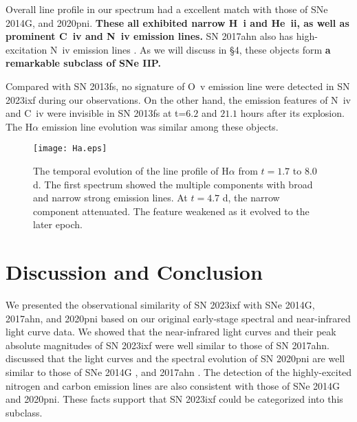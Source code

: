 \documentclass{pasj01}
\begin{document}
 Overall line profile in our spectrum had a excellent 
match with those of SNe 2014G, and 2020pni.
{\bf These all exhibited narrow H~{\sc i} and He~{\sc ii}, as well as 
prominent C~{\sc iv} and N~{\sc iv} emission lines.}
SN 2017ahn also has 
high-excitation N~{\sc iv} emission lines \citep{Tartagrlia2021}. 
As we will discuss in \S 4, these
objects form {\bf a remarkable subclass of SNe IIP.}
 
 Compared with SN 2013fs, no signature of O~{\sc v} 
emission line were detected in SN 2023ixf during 
our observations. On the
other hand, the emission features of N~{\sc iv} and 
C~{\sc iv} were invisible in SN 2013fs at t=$6.2$ and $21.1$ 
hours after its explosion. The H{$\alpha$} emission 
line evolution was similar among these objects.

\begin{figure}
 \begin{center}
  \texttt{[image: Ha.eps]}
 \end{center}
 \caption{The temporal evolution of the line profile of
 H{$\alpha$} from $t=1.7$ to $8.0$ d. The first 
 spectrum showed the multiple components with broad and 
 narrow strong emission lines. At $t=4.7$ d, 
 the narrow component attenuated. The feature 
 weakened as it evolved to the later epoch.}
\end{figure}

 
\section{Discussion and Conclusion}

 We presented the observational similarity of SN 2023ixf 
 with SNe 
 2014G, 2017ahn, and 2020pni based on our original
 early-stage spectral and near-infrared light curve data. 
 We showed that the near-infrared light curves and their 
peak absolute magnitudes of SN 2023ixf were 
well similar to those of SN 2017ahn.
 \citet{Terreran2022} discussed that the light curves and 
 the spectral evolution of SN 2020pni are 
well similar to those of SNe 2014G \citep{Terreran2016}, 
and 2017ahn \citep{Tartagrlia2021}.
The detection of the highly-excited nitrogen and carbon 
emission lines are also consistent with those of 
SNe 2014G and 2020pni. These facts support that 
SN 2023ixf could be categorized into this subclass.
 
\end{document}
